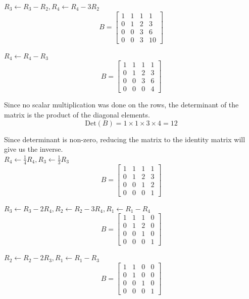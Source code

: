 \documentclass[a4paper]{article}
\begin{document}
\begin{enumerate}
\begin{enumerate}
            $R_3 \leftarrow R_3 - R_2, R_4 \leftarrow R_4 - 3R_2$\\
            \[B = \begin{bmatrix} 1 & 1 & 1 & 1 \\ 0 & 1 & 2 & 3 \\ 0 & 0 & 3 & 6 \\ 0 & 0 & 3 & 10 \end{bmatrix}\]

            $R_4 \leftarrow R_4 - R_3$\\
            \[B = \begin{bmatrix} 1 & 1 & 1 & 1 \\ 0 & 1 & 2 & 3 \\ 0 & 0 & 3 & 6 \\ 0 & 0 & 0 & 4 \end{bmatrix}\]

            Since no scalar multiplication was done on the rows, the determinant of the matrix is the product of the diagonal elements.\\
            \[\text{Det}(B) = 1 \times 1 \times 3 \times 4 = 12\]

            Since determinant is non-zero, reducing the matrix to the identity matrix will give us the inverse.\\

            $R_4 \leftarrow \frac{1}{4}R_4, R_3 \leftarrow \frac{1}{3}R_3$\\
            \[B = \begin{bmatrix} 1 & 1 & 1 & 1 \\ 0 & 1 & 2 & 3 \\ 0 & 0 & 1 & 2 \\ 0 & 0 & 0 & 1 \end{bmatrix}\]

            $R_3 \leftarrow R_3 - 2R_4, R_2 \leftarrow R_2 - 3R_4, R_1 \leftarrow R_1 - R_4$\\
            \[B = \begin{bmatrix} 1 & 1 & 1 & 0 \\ 0 & 1 & 2 & 0 \\ 0 & 0 & 1 & 0 \\ 0 & 0 & 0 & 1 \end{bmatrix}\]

            $R_2 \leftarrow R_2 - 2R_3, R_1 \leftarrow R_1 - R_3$\\
            \[B = \begin{bmatrix} 1 & 1 & 0 & 0 \\ 0 & 1 & 0 & 0 \\ 0 & 0 & 1 & 0 \\ 0 & 0 & 0 & 1 \end{bmatrix}\]


\end{enumerate}
\end{enumerate}
\end{document}

